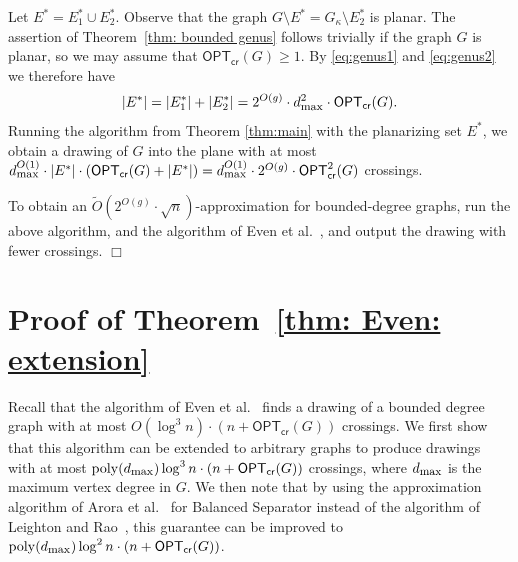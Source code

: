 \documentclass[twoside,leqno,twocolumn]{article}
\newcommand{\poly}{\operatorname{poly}}
\newcommand{\optcro}[1]{\mathsf{OPT}_{\mathsf{cr}}(#1)}
\newcommand{\optcrosq}[1]{\mathsf{OPT}^{2}_{\mathsf{cr}}(#1)}
\newcommand{\dmax}{d_{\mbox{\textup{\footnotesize{max}}}}}
\begin{document}
Let $E^*=E_1^*\cup E_2^*$.
Observe that the graph $G\setminus E^* = G_{\kappa}\setminus E_2^*$ is planar.
The assertion of Theorem~\ref{thm: bounded genus} follows trivially if the graph $G$ is planar, so we may assume that $\optcro{G}\geq 1$.
By \eqref{eq:genus1} and \eqref{eq:genus2} we therefore have
\begin{align}
|E^*| = |E^*_1| + |E^*_2| = 2^{O(g)} \cdot \dmax^2 \cdot \optcro{G}. \nonumber
\end{align}
Running the algorithm from Theorem \ref{thm:main} with the planarizing set $E^*$, we obtain a drawing of $G$ into the plane with at most $\dmax^{O(1)} \cdot |E^*| \cdot (\optcro{G} + |E^*|) = \dmax^{O(1)} \cdot 2^{O(g)} \cdot \optcrosq{G}$ crossings.

To obtain an $\tilde{O}\left(2^{O(g)} \cdot \sqrt{n}\right)$-approximation for bounded-degree graphs, 
run the above algorithm, and the algorithm of Even et al.~\cite{EvenGS02}, and output the drawing with fewer crossings.
\hfill \ensuremath{\Box}


\fi

\iffull
\section{Proof of Theorem~\ref{thm: Even: extension}}
Recall that the algorithm of Even et al.~\cite{EvenGS02} finds a drawing of a bounded degree graph with at most $O(\log^3 n) \cdot (n+\optcro{G})$
crossings. We first show that this algorithm can be extended to arbitrary graphs
to produce drawings with at most $\poly(\dmax) \log^3 n \cdot (n+\optcro{G})$ crossings, where $\dmax$ is the maximum vertex degree in $G$.
We then note that by using the approximation algorithm of Arora et al.~\cite{ARV} for {\sf Balanced Separator}
instead of the algorithm of Leighton and Rao~\cite{LR}, this guarantee can be improved to $\poly(\dmax) \log^2 n \cdot (n+\optcro{G})$.
\end{document}
